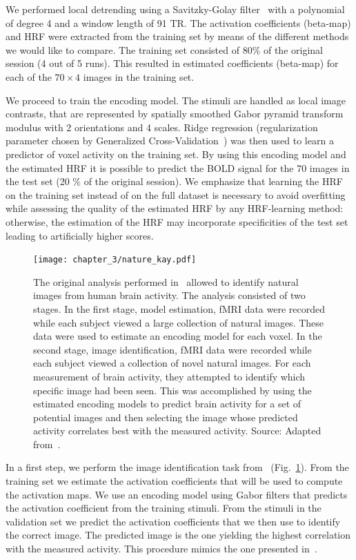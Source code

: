 We performed local detrending using a Savitzky-Golay
filter~\citep{savitzky1964smoothing} with a polynomial of degree 4 and a window
length of 91 TR. The activation coefficients (beta-map) and HRF were extracted from
the training set by means of the different methods we would like to compare. The
training set consisted of 80\% of the original session (4 out of 5 runs). This
resulted in estimated coefficients (beta-map) for each of the $70 \times 4$
images in the training set.



We proceed to train the encoding model. The stimuli are handled as local image contrasts,  that are represented by spatially
smoothed Gabor pyramid transform modulus with 2 orientations and 4 scales. 
Ridge regression (regularization parameter chosen by Generalized Cross-Validation~\citep{golub1979generalized}) was then used to learn a
predictor of voxel activity on the training set. By using this encoding model
and the estimated HRF it is possible to predict the BOLD signal for the 70
images in the test set (20 \% of the original session). We emphasize that learning the HRF on the training set instead of on the full
dataset is necessary to avoid overfitting while assessing the quality of the estimated HRF by any
HRF-learning method: otherwise, the estimation of the HRF may incorporate specificities of the test set leading to artificially higher scores.

\begin{figure}
\center\texttt{[image: chapter\_3/nature\_kay.pdf]}
\caption{
\label{fig:kay_encoding}
	The original analysis performed in~\citep{Kay2008} allowed to identify natural images from human brain activity. The analysis consisted of two stages. In the first stage, model estimation, fMRI data were recorded while each subject viewed a large collection of natural images. These data were used to estimate an encoding model for each voxel. In the second stage, image identification, fMRI data were recorded while each subject viewed a collection of novel natural images. For each measurement of brain activity, they attempted to identify which specific image had been seen. This was accomplished by using the estimated encoding models to predict brain activity for a set of potential images and then selecting the image whose predicted activity correlates best with the measured activity. Source: Adapted from~\citep{Kay2008}.
}
\end{figure}


In a first step, we perform the image identification task from~\citep{Kay2008} (Fig.~\ref{fig:kay_encoding}). From the training set we estimate the activation coefficients that will be used to compute the activation maps. We use an encoding model using Gabor filters that predicts the activation coefficient from the training stimuli. From the stimuli in the validation set we predict the activation coefficients that we then use to identify the correct image. The predicted image is the one yielding the highest correlation with the measured activity. This procedure mimics the one presented in~\citep[Supplementary material]{Kay2008}.



